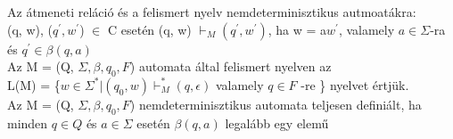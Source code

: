 \documentclass{article}
\begin{document}
    \noindent Az átmeneti reláció és a felismert nyelv nemdeterminisztikus autmoatákra: \\
    \indent (q, w), ($q^{'}, w^{'}$) $ \in $ C esetén (q, w) $ \vdash_M (q^{'}, w^{'})$, ha w = a$w^{'}$, valamely $ a \in \Sigma $-ra  és $ q^{'} \in \beta(q, a) $
    \\ \newline
    \noindent Az M = (Q, $ \Sigma,  \beta, q_0, F $) automata által felismert nyelven az \\
    \indent L(M) = \{$ w \in \Sigma^* | (q_0, w) \vdash_M^* (q, \epsilon ) $ valamely $ q \in F $ -re \} nyelvet értjük. \\ \newline
    \indent Az M = (Q, $ \Sigma, \beta, q_0, F $) nemdeterminisztikus automata teljesen definiált, ha minden $ q \in Q$ és $ a \in \Sigma $ esetén $ \beta(q, a) $ legalább egy elemű \\ \newline
    
\end{document}
